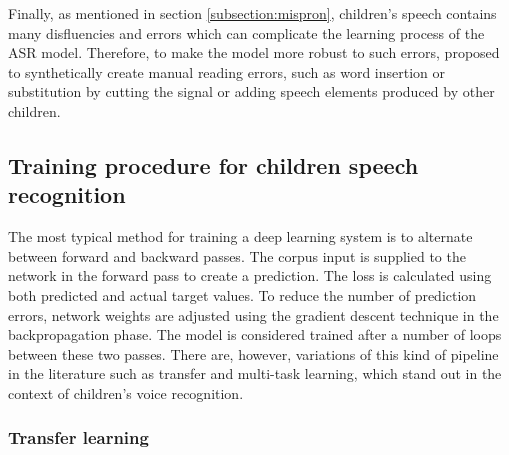 Finally, as mentioned in section \ref{subsection:mispron}, children's speech contains many disfluencies and errors which can complicate the learning process of the ASR model. Therefore, to make the model more robust to such errors, \cite{gelin2021simulating} proposed to synthetically create manual reading errors, such as word insertion or substitution by cutting the signal or adding speech elements produced by other children.





\subsection{Training procedure for children speech recognition}%

The most typical method for training a deep learning system is to alternate between forward and backward passes. The corpus input is supplied to the network in the forward pass to create a prediction. The loss is calculated using both predicted and actual target values. To reduce the number of prediction errors, network weights are adjusted using the gradient descent technique in the backpropagation phase. The model is considered trained after a number of loops between these two passes. There are, however, variations of this kind of pipeline in the literature such as transfer and multi-task learning, which stand out in the context of children's voice recognition.




\subsubsection{Transfer learning}%
\label{section:TL}


